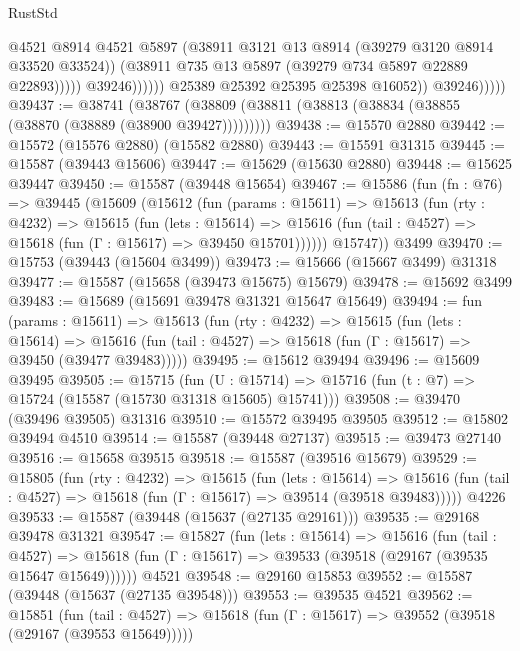 \begin{lexlean}{RustStd}
\begin{coremodule}
                                    @4521
                                    @8914
                                    @4521
                                    @5897
                                    (@38911 @3121 @13 @8914 (@39279 @3120 @8914 @33520 @33524))
                                    (@38911 @735 @13 @5897 (@39279 @734 @5897 @22889 @22893)))))
                              @39246))))))
                  @25389
                  @25392
                  @25395
                  @25398
                  @16052))
              @39246)))))
@39437 := @38741
    (@38767 (@38809 (@38811 (@38813 (@38834 (@38855 (@38870 (@38889 (@38900 @39427)))))))))
@39438 := @15570 @2880
@39442 := @15572 (@15576 @2880) (@15582 @2880)
@39443 := @15591 @31315
@39445 := @15587 (@39443 @15606)
@39447 := @15629 (@15630 @2880)
@39448 := @15625 @39447
@39450 := @15587 (@39448 @15654)
@39467 := @15586
    (fun (fn : @76) =>
    @39445
      (@15609
        (@15612
          (fun (params : @15611) =>
          @15613
            (fun (rty : @4232) =>
            @15615
              (fun (lets : @15614) =>
              @15616 (fun (tail : @4527) => @15618 (fun (Γ : @15617) => @39450 @15701))))))
        @15747))
    @3499
@39470 := @15753 (@39443 (@15604 @3499))
@39473 := @15666 (@15667 @3499) @31318
@39477 := @15587 (@15658 (@39473 @15675) @15679)
@39478 := @15692 @3499
@39483 := @15689 (@15691 @39478 @31321 @15647 @15649)
@39494 := fun (params : @15611) =>
  @15613
    (fun (rty : @4232) =>
    @15615
      (fun (lets : @15614) =>
      @15616 (fun (tail : @4527) => @15618 (fun (Γ : @15617) => @39450 (@39477 @39483)))))
@39495 := @15612 @39494
@39496 := @15609 @39495
@39505 := @15715
    (fun (U : @15714) => @15716 (fun (t : @7) => @15724 (@15587 (@15730 @31318 @15605) @15741)))
@39508 := @39470 (@39496 @39505) @31316
@39510 := @15572 @39495 @39505
@39512 := @15802 @39494 @4510
@39514 := @15587 (@39448 @27137)
@39515 := @39473 @27140
@39516 := @15658 @39515
@39518 := @15587 (@39516 @15679)
@39529 := @15805
    (fun (rty : @4232) =>
    @15615
      (fun (lets : @15614) =>
      @15616 (fun (tail : @4527) => @15618 (fun (Γ : @15617) => @39514 (@39518 @39483)))))
    @4226
@39533 := @15587 (@39448 (@15637 (@27135 @29161)))
@39535 := @29168 @39478 @31321
@39547 := @15827
    (fun (lets : @15614) =>
    @15616
      (fun (tail : @4527) =>
      @15618 (fun (Γ : @15617) => @39533 (@39518 (@29167 (@39535 @15647 @15649))))))
    @4521
@39548 := @29160 @15853
@39552 := @15587 (@39448 (@15637 (@27135 @39548)))
@39553 := @39535 @4521
@39562 := @15851
    (fun (tail : @4527) => @15618 (fun (Γ : @15617) => @39552 (@39518 (@29167 (@39553 @15649)))))

\end{coremodule}
\end{lexlean}

